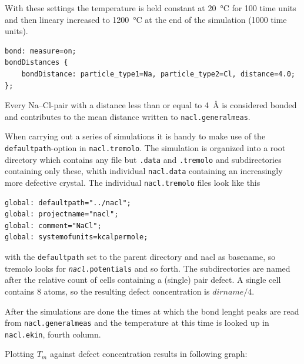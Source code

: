 With these settings the temperature is held constant at
\SI{20}{\celsius} for 100 time units and then lineary increased to
\SI{1200}{\celsius} at the end of the simulation (1000 time units).

\begin{lstlisting}
bond: measure=on;
bondDistances {
    bondDistance: particle_type1=Na, particle_type2=Cl, distance=4.0;
};
\end{lstlisting}

Every Na--Cl-pair with a distance less than or equal to \SI{4}{\angstrom} is
considered bonded and contributes to the mean distance written to
\texttt{nacl.generalmeas}.

When carrying out a series of simulations it is handy to make use of the
\texttt{defaultpath}-option in \texttt{nacl.tremolo}. The simulation is
organized into a root directory which contains any file but
\texttt{.data} and \texttt{.tremolo} and subdirectories containing only
these, whith individual \texttt{nacl.data} containing an increasingly
more defective crystal. The individual \texttt{nacl.tremolo} files look
like this

\begin{lstlisting}
global: defaultpath="../nacl";
global: projectname="nacl";
global: comment="NaCl";
global: systemofunits=kcalpermole;
\end{lstlisting}

with the \texttt{defaultpath} set to the parent directory and nacl as
basename, so tremolo looks for \texttt{\emph{nacl}.potentials} and so
forth. The subdirectories are named after the relative count of cells
containing a (single) pair defect. A single cell contains 8 atoms, so
the resulting defect concentration is $dirname/4$.

After the simulations are done the times at which the bond lenght peaks
are read from \texttt{nacl.generalmeas} and the temperature at this time
is looked up in \texttt{nacl.ekin}, fourth column.

Plotting $T_m$ against defect concentration results in following graph:

